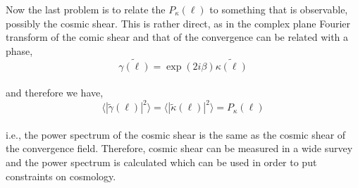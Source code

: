 Now the last problem is to relate the $P_{\kappa}(\ell)$ to something that is observable, 
possibly the cosmic shear. This is rather direct, as in the complex plane Fourier transform
of the comic shear and that of the
convergence can be related with a phase,
\begin{equation}
	\tilde{\gamma(\ell)} = \exp(2i\beta) \tilde{\kappa(\ell)}
\end{equation}
\\
and therefore we have,
\begin{equation}
	\langle |\tilde{\gamma}(\ell)|^2 \rangle = 
	\langle |\tilde{\kappa}(\ell)|^2 \rangle = P_{\kappa}(\ell)
\end{equation}
\\
i.e., the power spectrum of the cosmic shear is the same as the cosmic shear of the
convergence field. Therefore, cosmic shear can be measured in a wide survey and the 
power spectrum is calculated which can be used in order to put constraints on
cosmology.





